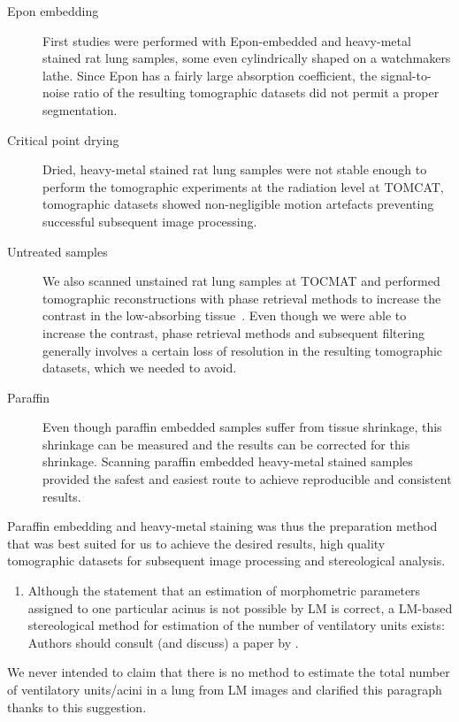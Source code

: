 \documentclass[english,paper=a4]{scrartcl}
\begin{document}
\begin{description}
	\item [Epon embedding] First studies were performed with Epon-embedded and heavy-metal stained rat lung samples, some even cylindrically shaped on a watchmakers lathe.
		Since Epon has a fairly large absorption coefficient, the signal-to-noise ratio of the resulting tomographic datasets did not permit a proper segmentation.
	\item [Critical point drying] Dried, heavy-metal stained rat lung samples were not stable enough to perform the tomographic experiments at the radiation level at TOMCAT, tomographic datasets showed non-negligible motion artefacts preventing successful subsequent image processing.
	\item [Untreated samples] We also scanned unstained rat lung samples at TOCMAT and performed tomographic reconstructions with phase retrieval methods to increase the contrast in the low-absorbing tissue~\citep{Marone2011}.
	Even though we were able to increase the contrast, phase retrieval methods and subsequent filtering generally involves a certain loss of resolution in the resulting tomographic datasets, which we needed to avoid.
	\item [Paraffin] Even though paraffin embedded samples suffer from tissue shrinkage, this shrinkage can be measured and the results can be corrected for this shrinkage.
	Scanning paraffin embedded heavy-metal stained samples provided the safest and easiest route to achieve reproducible and consistent results.
\end{description}

Paraffin embedding and heavy-metal staining was thus the preparation method that was best suited for us to achieve the desired results, high quality tomographic datasets for subsequent image processing and stereological analysis.

\begin{enumerate}[start=5]
	\item \textelp{} Although the statement that an estimation of morphometric parameters assigned to one particular acinus is not possible by LM is correct, a LM-based stereological method for estimation of the number of ventilatory units \textelp{} exists: Authors should consult (and discuss) a paper by \citet{Wulfsohn2010}.
\end{enumerate}
We never intended to claim that there is no method to estimate the total number of ventilatory units/acini in a lung from LM images and clarified this paragraph thanks to this suggestion.
\end{document}
